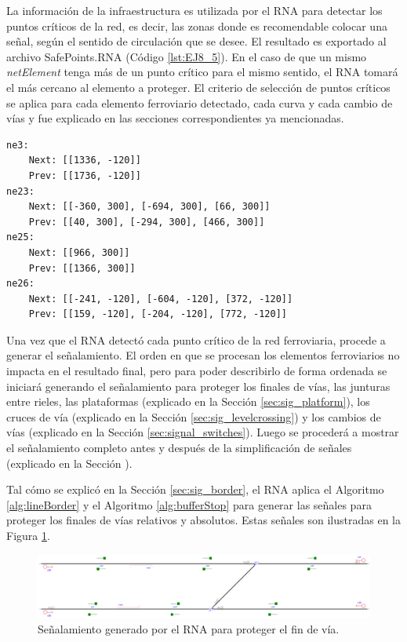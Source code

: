 	La información de la infraestructura es utilizada por el RNA para detectar los puntos críticos de la red, es decir, las zonas donde es recomendable colocar una señal, según el sentido de circulación que se desee. El resultado es exportado al archivo SafePoints.RNA (Código \ref{lst:EJ8_5}). En el caso de que un mismo \textit{netElement} tenga más de un punto crítico para el mismo sentido, el RNA tomará el más cercano al elemento a proteger. El criterio de selección de puntos críticos se aplica para cada elemento ferroviario detectado, cada curva y cada cambio de vías y fue explicado en las secciones correspondientes ya mencionadas.
	
	\begin{lstlisting}[language = {}, caption = SafePoints.RNA, label = {lst:EJ8_5}]
ne3:
	Next: [[1336, -120]]
	Prev: [[1736, -120]]
ne23:
	Next: [[-360, 300], [-694, 300], [66, 300]]
	Prev: [[40, 300], [-294, 300], [466, 300]]
ne25:
	Next: [[966, 300]]
	Prev: [[1366, 300]]
ne26:
	Next: [[-241, -120], [-604, -120], [372, -120]]
	Prev: [[159, -120], [-204, -120], [772, -120]]
	\end{lstlisting}	
	
	Una vez que el RNA detectó cada punto crítico de la red ferroviaria, procede a generar el señalamiento. El orden en que se procesan los elementos ferroviarios no impacta en el resultado final, pero para poder describirlo de forma ordenada se iniciará generando el señalamiento para proteger los finales de vías, las junturas entre rieles, las plataformas (explicado en la Sección \ref{sec:sig_platform}), los cruces de vía (explicado en la Sección \ref{sec:sig_levelcrossing}) y los cambios de vías (explicado en la Sección \ref{sec:signal_switches}). Luego se procederá a mostrar el señalamiento completo antes y después de la simplificación de señales (explicado en la Sección \label{sec:simplificacion}). 
	
	Tal cómo se explicó en la Sección \ref{sec:sig_border}, el RNA aplica el Algoritmo \ref{alg:lineBorder} y el Algoritmo \ref{alg:bufferStop} para generar las señales para proteger los finales de vías relativos y absolutos. Estas señales son ilustradas en la Figura \ref{fig:EJ8_3}.
	
	\begin{figure}[H]
		\centering
		\includegraphics[width=1\textwidth]{resultados-obtenidos/ejemplo8/images/8_step1.png}
		\centering\caption{Señalamiento generado por el RNA para proteger el fin de vía.}
		\label{fig:EJ8_3}
	\end{figure}
	
